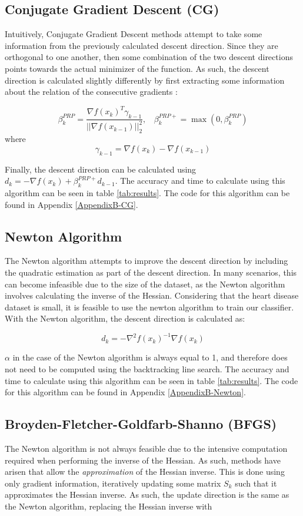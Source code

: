 \documentclass[12pt,conference]{IEEEtran}
\begin{document}
\subsection {Conjugate Gradient Descent (CG)}
Intuitively, Conjugate Gradient Descent methods attempt to take some information from the previously calculated descent direction. Since they are orthogonal to one another, then some combination of the two descent directions points towards the actual minimizer of the function. As such, the descent direction is calculated slightly differently by first extracting some information about the relation of the consecutive gradients \cite{course-notes}:

$$\beta_k^{PRP} = \frac{\nabla f(x_k)^T \gamma_{k-1}}{||\nabla f(x_{k-1})||^2_2},\ \ \ \ \beta_k^{PRP+} = \max{\left(0, \beta_k^{PRP}\right)} $$ where
$$\gamma_{k-1} = \nabla f(x_k) - \nabla f(x_{k-1})$$

Finally, the descent direction can be calculated using $d_k = -\nabla f(x_k) + \beta^{PRP+}_kd_{k-1}$. The accuracy and time to calculate using this algorithm can be seen in table \ref{tab:results}. The code for this algorithm can be found in Appendix \ref{AppendixB-CG}.

\subsection {Newton Algorithm}
The Newton algorithm attempts to improve the descent direction by including the quadratic estimation as part of the descent direction. In many scenarios, this can become infeasible due to the size of the dataset, as the Newton algorithm involves calculating the inverse of the Hessian. Considering that the heart disease dataset is small, it is feasible to use the newton algorithm to train our classifier. With the Newton algorithm, the descent direction is calculated as:

$$d_k = -\nabla^2f(x_k)^{-1}\nabla f(x_k)$$

$\alpha$ in the case of the Newton algorithm is always equal to 1, and therefore does not need to be computed using the backtracking line search. The accuracy and time to calculate using this algorithm can be seen in table \ref{tab:results}. The code for this algorithm can be found in Appendix \ref{AppendixB-Newton}.

\subsection {Broyden-Fletcher-Goldfarb-Shanno (BFGS)}
The Newton algorithm is not always feasible due to the intensive computation required when performing the inverse of the Hessian. As such, methods have arisen that allow the \textit{approximation} of the Hessian inverse. This is done using only gradient information, iteratively updating some matrix $S_k$ such that it approximates the Hessian inverse. As such, the update direction is the same as the Newton algorithm, replacing the Hessian inverse with
\end{document}
